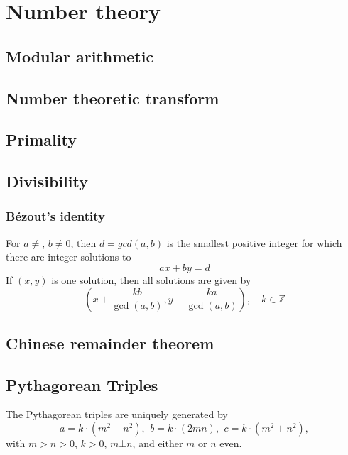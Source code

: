 \chapter{Number theory}

\section{Modular arithmetic}

\section{Number theoretic transform}

\section{Primality}

\section{Divisibility}

	\subsection{Bézout's identity}
	For $a \neq $, $b \neq 0$, then $d=gcd(a,b)$ is the smallest positive integer for which there are integer solutions to
	$$ax+by=d$$
	If $(x,y)$ is one solution, then all solutions are given by
	$$\left(x+\frac{kb}{\gcd(a,b)}, y-\frac{ka}{\gcd(a,b)}\right), \quad k\in\mathbb{Z}$$

	\columnbreak

\section{Chinese remainder theorem}

\section{Pythagorean Triples}
 The Pythagorean triples are uniquely generated by
 \[ a=k\cdot (m^{2}-n^{2}),\ \,b=k\cdot (2mn),\ \,c=k\cdot (m^{2}+n^{2}), \]
 with $m > n > 0$, $k > 0$, $m \bot n$, and either $m$ or $n$ even.

